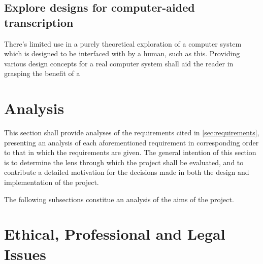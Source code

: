 \subsection{Explore designs for computer-aided transcription}

There's limited use in a purely theoretical exploration of a computer system which is designed to be interfaced with by a human, such as this.
Providing various design concepts for a real computer system shall aid the reader in grasping the benefit of a 

\section{Analysis}

This section shall provide analyses of the requirements cited in \ref{sec:requirements}, presenting an analysis of each aforementioned requirement in corresponding order to that in which the requirements are given.
The general intention of this section is to determine the lens through which the project shall be evaluated, and to contribute a detailed motivation for the decisions made in both the design and implementation of the project.

The following subsections constitue an analysis of the aims of the project.

\subsection{}
\subsection{}
\subsection{}
\subsection{}

\section{Ethical, Professional and Legal Issues}\label{sec:ethics-etc}

